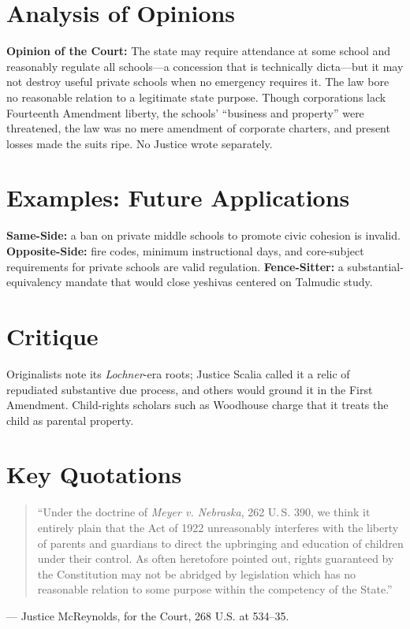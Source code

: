 \documentclass[12pt]{article}
\begin{document}
\section{Analysis of Opinions}
\textbf{Opinion of the Court:} The state may require attendance at some school and reasonably regulate all schools---a concession that is technically dicta---but it may not destroy useful private schools when no emergency requires it. The law bore no reasonable relation to a legitimate state purpose. Though corporations lack Fourteenth Amendment liberty, the schools' ``business and property'' were threatened, the law was no mere amendment of corporate charters, and present losses made the suits ripe. No Justice wrote separately.

\section{Examples: Future Applications}
\textbf{Same-Side:} a ban on private middle schools to promote civic cohesion is invalid. \textbf{Opposite-Side:} fire codes, minimum instructional days, and core-subject requirements for private schools are valid regulation. \textbf{Fence-Sitter:} a substantial-equivalency mandate that would close yeshivas centered on Talmudic study.

\section{Critique}
Originalists note its \textit{Lochner}-era roots; Justice Scalia called it a relic of repudiated substantive due process, and others would ground it in the First Amendment. Child-rights scholars such as Woodhouse charge that it treats the child as parental property.

\section{Key Quotations}
\begin{quote}
``Under the doctrine of \textit{Meyer v. Nebraska}, 262 U.\,S. 390, we think it entirely plain that the Act of 1922 unreasonably interferes with the liberty of parents and guardians to direct the upbringing and education of children under their control. As often heretofore pointed out, rights guaranteed by the Constitution may not be abridged by legislation which has no reasonable relation to some purpose within the competency of the State.''
\end{quote}
\noindent --- Justice McReynolds, for the Court, 268 U.S. at 534--35.
\end{document}
